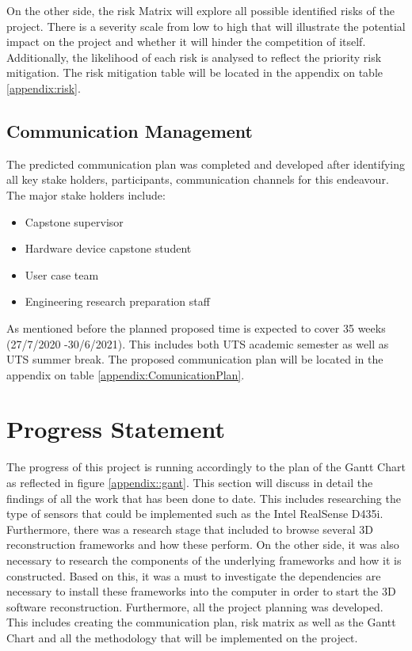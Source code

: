 \documentclass[12pt]{report}
\begin{document}
On the other side, the risk Matrix will explore all possible identified risks of the project. 
There is a severity scale from low to high that will illustrate the potential impact on the project and whether it will hinder the competition of itself.
 Additionally, the likelihood of each risk is analysed to reflect the priority risk mitigation. 
The risk mitigation table will be located in the appendix on table \ref{appendix:risk}. 

\section{Communication Management}
The predicted communication plan was completed and developed after identifying all key stake holders, participants, communication channels for this endeavour. The major stake holders include:
\begin{itemize}
  \item Capstone supervisor
  \item Hardware device capstone student
  \item User case team
  \item Engineering research preparation staff
\end{itemize}
As mentioned before the planned proposed time is expected to cover 35 weeks (27/7/2020 -30/6/2021). This includes both UTS academic semester as well as UTS summer break. 
The proposed communication plan will be located in the appendix on table \ref{appendix:ComunicationPlan}. 

\chapter{Progress Statement}
The progress of this project is running accordingly to the plan of the Gantt Chart as reflected in figure \ref{appendix::gant}.
This section will discuss in detail the findings of all the work that has been done to date.
This includes researching the type of sensors that could be implemented such as the Intel RealSense D435i. 
Furthermore, there was a research stage that included to browse several 3D reconstruction frameworks and how these perform. 
On the other side, it was also necessary to research the components of the underlying frameworks and how it is constructed. Based on this, it was a must to investigate the dependencies 
are necessary to install these frameworks into the computer in order to start the 3D software reconstruction. 
Furthermore, all the project planning was developed. This includes creating the communication plan, risk matrix as well as the Gantt Chart and all the methodology that will be implemented on the project. 
\end{document}
